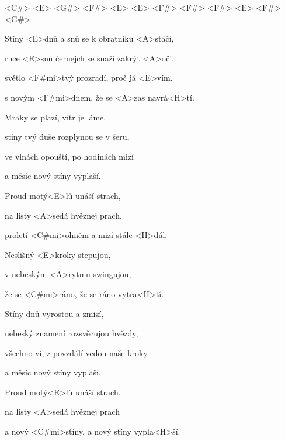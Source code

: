 

<C#> <E> <G#> <F#> <E> <E> <F#> <F#> <F#> <E> <F#> <G#>

\zs
Stíny <E>dnů a snů se k obratníku <A>stáčí,

ruce <E>snů černejch se snaží zakrýt <A>oči,

světlo <F#mi>tvý prozradí, proč já <E>vím,

s novým <F#mi>dnem, že se <A>zas navrá<H>tí.
\ks

\zs
Mraky se plazí, vítr je láme,

stíny tvý duše rozplynou se v šeru,

ve vlnách opouští, po hodinách mizí

a měsíc nový stíny vyplaší.
\ks

\zr
Proud motý<E>lů unáší strach,

na listy <A>sedá hvěznej prach,

proletí <C#mi>ohněm a mizí stále <H>dál.

Neslišný <E>kroky stepujou,

v nebeským <A>rytmu swingujou,

že se <C#mi>ráno, že se ráno vytra<H>tí.
\kr

\zs
Stíny dnů vyrostou a zmizí,

nebeský znamení rozsvěcujou hvězdy,

všechno ví, z povzdálí vedou naše kroky

a měsíc nový stíny vyplaší.
\ks

\zr \kr

\zr
Proud motý<E>lů unáší strach,

na listy <A>sedá hvěznej prach

a nový <C#mi>stíny, a nový stíny vypla<H>ší.
\kr

\kp
